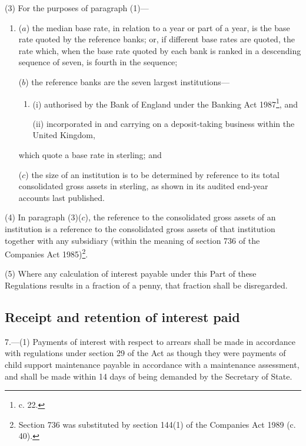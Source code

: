 \documentclass[12pt,a4paper]{article}
\begin{document}
(3) For the purposes of paragraph (1)—
\begin{enumerate}\item[]
($a$) the median base rate, in relation to a year or part of a year, is the base rate quoted by the reference banks; or, if different base rates are quoted, the rate which, when the base rate quoted by each bank is ranked in a descending sequence of seven, is fourth in the sequence;

($b$) the reference banks are the seven largest institutions—
\begin{enumerate}\item[]
(i) authorised by the Bank of England under the Banking Act 1987\footnote{ c. 22.}, and

(ii) incorporated in and carrying on a deposit-taking business within the United Kingdom,
\end{enumerate}
which quote a base rate in sterling; and

($c$) the size of an institution is to be determined by reference to its total consolidated gross assets in sterling, as shown in its audited end-year accounts last published.
\end{enumerate}

(4) In paragraph (3)($c$), the reference to the consolidated gross assets of an institution is a reference to the consolidated gross assets of that institution together with any subsidiary (within the meaning of section 736 of the Companies Act 1985)\footnote{\frenchspacing Section 736 was substituted by section 144(1) of the Companies Act 1989 (c. 40).}.

(5) Where any calculation of interest payable under this Part of these Regulations results in a fraction of a penny, that fraction shall be disregarded.


\subsection[7. Receipt and retention of interest paid]{Receipt and retention of interest paid}

7.—(1) Payments of interest with respect to arrears shall be made in accordance with regulations under section 29 of the Act as though they were payments of child support maintenance payable in accordance with a maintenance assessment, and shall be made within 14 days of being demanded by the Secretary of State.
\end{document}
